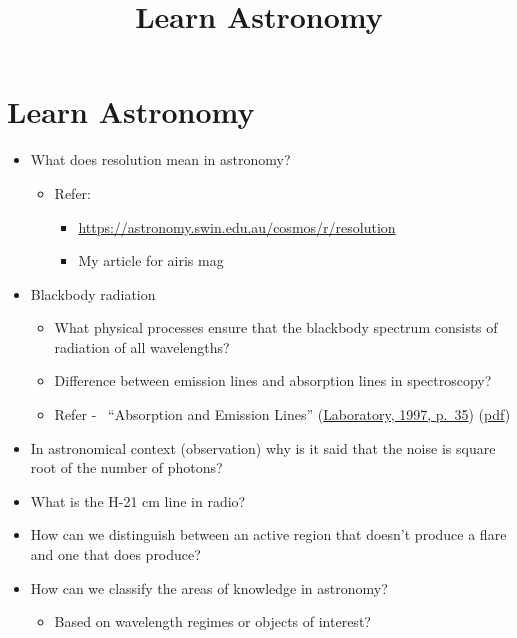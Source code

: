\documentclass{../template/texnote}
\title{Learn Astronomy}
\begin{document}
    \maketitle {}
\section{Learn Astronomy}\label{learn-astronomy}

\begin{itemize}
\item
  What does resolution mean in astronomy?

  \begin{itemize}
  \item
    Refer:

    \begin{itemize}
    \tightlist
    \item
      \url{https://astronomy.swin.edu.au/cosmos/r/resolution}
    \item
      My article for airis mag
    \end{itemize}
  \end{itemize}
\item
  Blackbody radiation

  \begin{itemize}
  \tightlist
  \item
    What physical processes ensure that the blackbody spectrum consists
    of radiation of all wavelengths?
  \item
    Difference between emission lines and absorption lines in
    spectroscopy?
  \item
    Refer - ~``Absorption and Emission Lines''
    (\href{zotero://select/library/items/AP2G2R7N}{Laboratory, 1997,
    p.~35})
    (\href{zotero://open-pdf/library/items/M28PLAU2?page=35}{pdf})
  \end{itemize}
\item
  In astronomical context (observation) why is it said that the noise is
  square root of the number of photons?
\item
  What is the H-21 cm line in radio?
\item
  How can we distinguish between an active region that doesn't produce a
  flare and one that does produce?
\item
  How can we classify the areas of knowledge in astronomy?

  \begin{itemize}
  \item
    Based on wavelength regimes or objects of interest?


\end{itemize}
\end{itemize}
\end{document}
